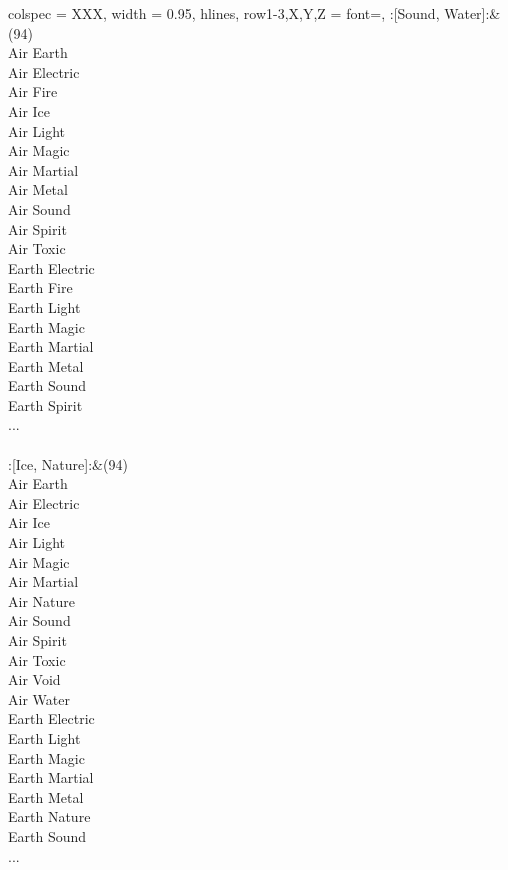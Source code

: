 \begin{longtblr}[
	caption = {2v2 Attacking Effective},
	label = {2v2-Attacking-Effective},
]{
	colspec = {XXX}, width = 0.95\linewidth,
	hlines,
	row{1-3,X,Y,Z} = {font=\bfseries},
}
	:[Sound, Water]:&{(94)\\
	Air Earth \\
	Air Electric \\
	Air Fire \\
	Air Ice \\
	Air Light \\
	Air Magic \\
	Air Martial \\
	Air Metal \\
	Air Sound \\
	Air Spirit \\
	Air Toxic \\
	Earth Electric \\
	Earth Fire \\
	Earth Light \\
	Earth Magic \\
	Earth Martial \\
	Earth Metal \\
	Earth Sound \\
	Earth Spirit \\
	...\\
	}\\

	:[Ice, Nature]:&{(94)\\
	Air Earth \\
	Air Electric \\
	Air Ice \\
	Air Light \\
	Air Magic \\
	Air Martial \\
	Air Nature \\
	Air Sound \\
	Air Spirit \\
	Air Toxic \\
	Air Void \\
	Air Water \\
	Earth Electric \\
	Earth Light \\
	Earth Magic \\
	Earth Martial \\
	Earth Metal \\
	Earth Nature \\
	Earth Sound \\
	...\\
	}\\


\end{longtblr}
